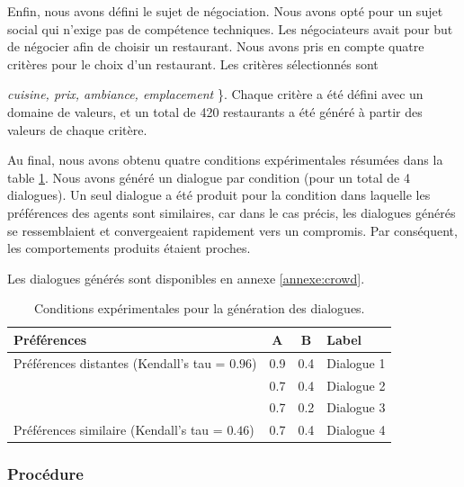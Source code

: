 				
				Enfin, nous avons défini le sujet de négociation. Nous avons opté pour un sujet social qui n'exige pas de compétence techniques. Les négociateurs avait pour but de négocier afin de choisir un restaurant. Nous avons pris en compte quatre critères pour le choix d'un restaurant. 	Les critères sélectionnés sont \ {\textit {cuisine, prix, ambiance, emplacement} \}. Chaque critère a été défini avec un domaine de valeurs, et un total de 420 restaurants a été généré à partir des valeurs de chaque critère.
				
				
				Au final, nous avons obtenu quatre conditions expérimentales résumées dans la table \ref{table:conditions}. Nous avons généré un dialogue par condition (pour un total de 4 dialogues). Un seul dialogue a été produit pour la condition dans laquelle les préférences des agents sont similaires, car dans le cas précis, les dialogues générés se ressemblaient et convergeaient rapidement vers un compromis. Par conséquent, les comportements produits étaient proches.   
				
				Les dialogues générés sont disponibles en annexe \ref{annexe:crowd}.
				
				\begin{table}[h]
					\centering
					\begin{tabular}{ |l|c|c|l| }
						\hline
						\textbf{Préférences}& \textbf{A} & \textbf{B} & \textbf{Label} \\ 
						\hline
						\newline\multirow{3}{*} {Préférences distantes (Kendall's tau = $0.96$)} & 0.9 & 0.4 & Dialogue 1 \\ \cline{2-4}
						
						\newline  & 0.7 & 0.4 & Dialogue 2\\ \cline{2-4}
						
						\newline   &0.7 & 0.2 & Dialogue 3\\ 
						\hline
						\newline Préférences similaire (Kendall's tau = $0.46$) & 0.7 & 0.4 & Dialogue 4\\
						\hline
					\end{tabular}
					\caption{Conditions expérimentales pour la génération des dialogues.} 
					\label{table:conditions}
				\end{table}
		
			\subsubsection{Procédure}
				
}
